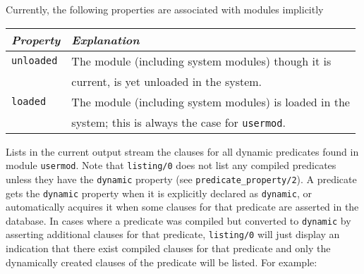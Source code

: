 \begin{description}
    Currently, the following properties are associated with modules 
    implicitly 

    \begin{center}
    \begin{tabular}{||l|l||}               \hline 
	{\em Property}		& {\em Explanation} \\ \hline \hline
	{\tt unloaded}		& 
		The module (including system modules) though it is \\
	&	current, is yet unloaded in the system. \\ \hline
	{\tt loaded}		& 
		The module (including system modules) is loaded in the \\
	&	system; this is always the case for {\tt usermod}.\\ \hline
    \end{tabular}
    \end{center}

    Lists in the current output stream the clauses for all dynamic
    predicates found in module {\tt usermod}.  Note that {\tt listing/0}
    does not list any compiled predicates unless they have the
    {\tt dynamic} property (see {\tt predicate\_property/2}).  A
    predicate gets the {\tt dynamic} property when it is explicitly
    declared as {\tt dynamic}, or automatically acquires it when some
    clauses for that predicate are asserted in the database.  In
    cases where a predicate was compiled but converted to {\tt dynamic}
    by asserting additional clauses for that predicate, {\tt listing/0}
    will just display an indication that there exist compiled clauses
    for that predicate and only the dynamically created clauses of the
    predicate will be listed.  For example:



\end{description}
